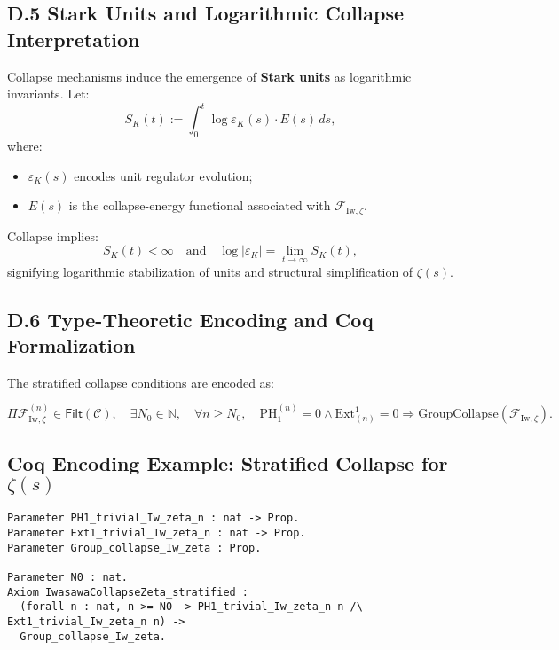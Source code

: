 \documentclass[11pt]{article}
\begin{document}
\subsection*{D.5 Stark Units and Logarithmic Collapse Interpretation}

Collapse mechanisms induce the emergence of \textbf{Stark units} as logarithmic invariants. Let:
\[
S_K(t) := \int_0^t \log \varepsilon_K(s) \cdot E(s) \, ds,
\]
where:
\begin{itemize}
    \item $\varepsilon_K(s)$ encodes unit regulator evolution;
    \item $E(s)$ is the collapse-energy functional associated with $\mathcal{F}_{\mathrm{Iw}, \zeta}$.
\end{itemize}

Collapse implies:
\[
S_K(t) < \infty \quad \text{and} \quad \log |\varepsilon_K| = \lim_{t \to \infty} S_K(t),
\]
signifying logarithmic stabilization of units and structural simplification of $\zeta(s)$.

\subsection*{D.6 Type-Theoretic Encoding and Coq Formalization}

The stratified collapse conditions are encoded as:

\[
\Pi \mathcal{F}_{\mathrm{Iw}, \zeta}^{(n)} \in \mathsf{Filt}(\mathcal{C}), \quad
\exists N_0 \in \mathbb{N}, \quad 
\forall n \geq N_0, \quad 
\mathrm{PH}_1^{(n)} = 0 \wedge \mathrm{Ext}^1_{(n)} = 0
\Rightarrow 
\mathrm{GroupCollapse}(\mathcal{F}_{\mathrm{Iw}, \zeta}).
\]

\subsection*{Coq Encoding Example: Stratified Collapse for $\zeta(s)$}

\begin{lstlisting}[language=Coq, caption=Stratified Collapse for the Riemann Zeta Function, captionpos=b]
Parameter PH1_trivial_Iw_zeta_n : nat -> Prop.
Parameter Ext1_trivial_Iw_zeta_n : nat -> Prop.
Parameter Group_collapse_Iw_zeta : Prop.

Parameter N0 : nat.
Axiom IwasawaCollapseZeta_stratified :
  (forall n : nat, n >= N0 -> PH1_trivial_Iw_zeta_n n /\ Ext1_trivial_Iw_zeta_n n) ->
  Group_collapse_Iw_zeta.
\end{lstlisting}
\end{document}
